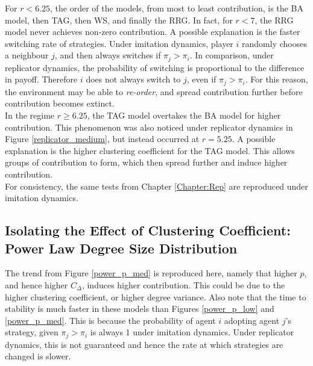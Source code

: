 For $r<6.25$, the order of the models, from most to least contribution, is the BA model, then TAG, then WS, and finally the RRG. In fact, for $r<7$, the RRG model never achieves non-zero contribution. A possible explanation is the faster switching rate of strategies. Under imitation dynamics, player $i$ randomly chooses a neighbour $j$, and then always switches if $\pi_j>\pi_i$. In comparison, under replicator dynamics, the probability of switching is proportional to the difference in payoff. Therefore $i$ does not always switch to $j$, even if $\pi_j>\pi_i$. For this reason, the environment may be able to \emph{re-order}, and spread contribution further before contribution becomes extinct. \\

In the regime $r\geq 6.25$, the TAG model overtakes the BA model for higher contribution. This phenomenon was also noticed under replicator dynamics in Figure \ref{replicator_medium}, but instead occurred at $r=5.25$. A possible explanation is the higher clustering coefficient for the TAG model. This allows groups of contribution to form, which then spread further and induce higher contribution. \\

For consistency, the same tests from Chapter \ref{Chapter:Rep} are reproduced under imitation dynamics. 

\subsection{Isolating the Effect of Clustering Coefficient: Power Law Degree Size Distribution}

\FloatBarrier
{}
\FloatBarrier
{} \FloatBarrier

The trend from Figure \ref{power_p_med} is reproduced here, namely that higher $p$, and hence higher $C_\Delta$, induces higher contribution. This could be due to the higher clustering coefficient, or higher degree variance. Also note that the time to stability is much faster in these models than Figures \ref{power_p_low} and \ref{power_p_med}. This is because the probability of agent $i$ adopting agent $j$'s strategy, given $\pi_j > \pi_i$ is always 1 under imitation dynamics. Under replicator dynamics, this is not guaranteed and hence the rate at which strategies are changed is slower. 


